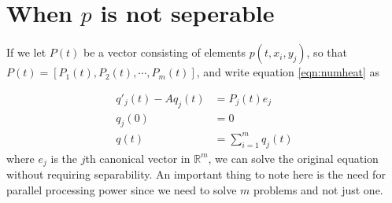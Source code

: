 \section{When $p$ is not seperable}
If we let $P(t)$ be a vector consisting of elements $p(t, x_i, y_j)$, so that $P(t) = [P_1(t),P_2(t),\cdots, P_m(t)]$, and write equation \eqref{eqn:numheat} as

\begin{equation}
\begin{aligned}
q'_j(t) -A q_j(t) &= P_j(t) e_j \\
q_j(0) &= 0\\
q(t) &= \sum \limits_{i = 1}^m q_j(t)
\end{aligned}
\end{equation}
where $e_j$ is the $j$th canonical vector in $\mathbb{R}^{m}$, we can solve the original equation without requiring separability. 
An important thing to note here is the need for parallel processing power since we need to solve $m$ problems and not just one.
